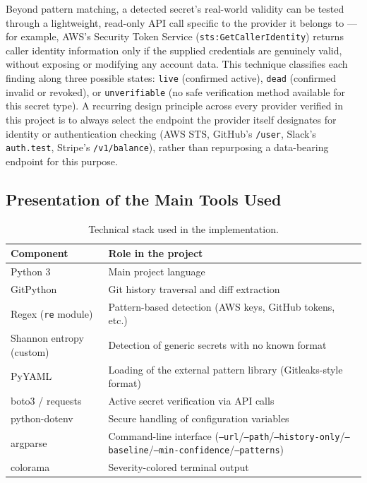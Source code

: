 \documentclass[12pt]{article}
\begin{document}
Beyond pattern matching, a detected secret's real-world validity can be tested through a lightweight, read-only API call specific to the provider it belongs to --- for example, AWS's Security Token Service (\texttt{sts:GetCallerIdentity}) returns caller identity information only if the supplied credentials are genuinely valid, without exposing or modifying any account data. This technique classifies each finding along three possible states: \texttt{live} (confirmed active), \texttt{dead} (confirmed invalid or revoked), or \texttt{unverifiable} (no safe verification method available for this secret type). A recurring design principle across every provider verified in this project is to always select the endpoint the provider itself designates for identity or authentication checking (AWS STS, GitHub's \texttt{/user}, Slack's \texttt{auth.test}, Stripe's \texttt{/v1/balance}), rather than repurposing a data-bearing endpoint for this purpose.

\subsection{Presentation of the Main Tools Used}

\begin{table}[h]
\centering
\begin{tabularx}{\textwidth}{|p{}|Y|}
\hline
\textbf{Component} & \textbf{Role in the project} \\
\hline
Python 3 & Main project language \\
GitPython & Git history traversal and diff extraction \\
Regex (\texttt{re} module) & Pattern-based detection (AWS keys, GitHub tokens, etc.) \\
Shannon entropy (custom) & Detection of generic secrets with no known format \\
PyYAML & Loading of the external pattern library (Gitleaks-style format) \\
boto3 / requests & Active secret verification via API calls \\
python-dotenv & Secure handling of configuration variables \\
argparse & Command-line interface (\texttt{--url}/\texttt{--path}/\texttt{--history-only}/\texttt{--baseline}/\texttt{--min-confidence}/\texttt{--patterns}) \\
colorama & Severity-colored terminal output \\
\hline
\end{tabularx}
\caption{Technical stack used in the implementation.}
\label{tab:tech-stack}
\end{table}
\end{document}
